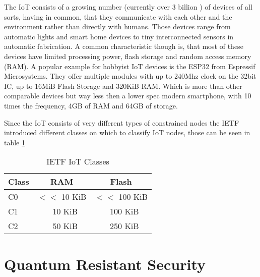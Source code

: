 \documentclass[conference]{IEEEtran}
\begin{document}
The IoT consists of a growing number (currently over 3 billion \cite{QR_IoT}) of devices of all sorts, having in common, that they communicate with each other and the environment rather than directly with humans.
Those devices range from automatic lights and smart home devices to tiny interconnected sensors in automatic fabrication.
A common characteristic though is, that most of these devices have limited processing power, flash storage and random access memory (RAM). 
A popular example for hobbyist IoT devices is the ESP32 from Espressif Microsystems.
They offer multiple modules with up to 240Mhz clock on the 32bit IC, up to 16MiB Flash Storage and 320KiB RAM.
Which is more than other comparable devices but way less then a lower spec modern smartphone, with 10 times the frequency, 4GB of RAM and 64GB of storage.

Since the IoT consists of very different types of constrained nodes the IETF introduced different classes on which to classify IoT nodes, those can be seen in table \ref{IoT-classes}

\begin{table}
    \label{IoT-classes}
    \centering
    \caption{IETF IoT Classes}
    \begin{tabular}{|l | c c|}
        \hline
        Class & RAM & Flash \\
        \hline
        C0 & $<<$ 10 KiB & $<<$ 100 KiB\\
        C1 & ~ 10 KiB & ~ 100 KiB\\
        C2 & ~ 50 KiB & ~ 250 KiB\\
        \hline
    \end{tabular} 
\end{table}



\section{Quantum Resistant Security}
\end{document}
